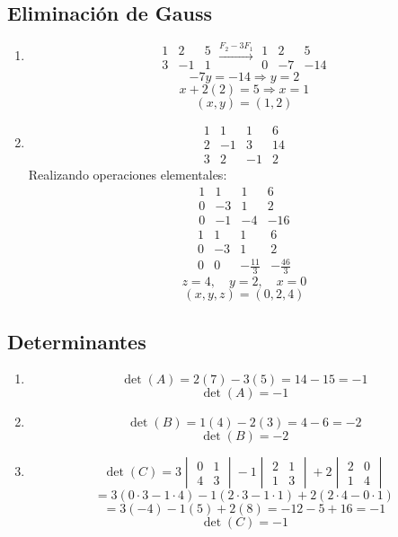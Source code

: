\documentclass[12pt,a4paper]{article}
\begin{document}
\subsection*{Eliminación de Gauss}
\begin{enumerate}
    \item
    \[
    \begin{array}{cc|c}
    1 & 2 & 5 \\
    3 & -1 & 1
    \end{array}
    \xrightarrow{F_2-3F_1}
    \begin{array}{cc|c}
    1 & 2 & 5 \\
    0 & -7 & -14
    \end{array}
    \]
    \[
    -7y = -14 \Rightarrow y = 2
    \]
    \[
    x + 2(2) = 5 \Rightarrow x = 1
    \]
    \[
    \boxed{(x,y)=(1,2)}
    \]

    \item
    \[
    \begin{array}{ccc|c}
    1 & 1 & 1 & 6 \\
    2 & -1 & 3 & 14 \\
    3 & 2 & -1 & 2
    \end{array}
    \]
    Realizando operaciones elementales:
    \[
    \begin{array}{ccc|c}
    1 & 1 & 1 & 6 \\
    0 & -3 & 1 & 2 \\
    0 & -1 & -4 & -16
    \end{array}
    \]
    \[
    \begin{array}{ccc|c}
    1 & 1 & 1 & 6 \\
    0 & -3 & 1 & 2 \\
    0 & 0 & -\frac{11}{3} & -\frac{46}{3}
    \end{array}
    \]
    \[
    z = 4, \quad y = 2, \quad x = 0
    \]
    \[
    \boxed{(x,y,z)=(0,2,4)}
    \]
\end{enumerate}

\subsection*{Determinantes}
\begin{enumerate}
    \item
    \[
    \det(A) = 2(7)-3(5)=14-15=-1
    \]
    \[
    \boxed{\det(A)=-1}
    \]

    \item
    \[
    \det(B) = 1(4)-2(3)=4-6=-2
    \]
    \[
    \boxed{\det(B)=-2}
    \]

    \item
    \[
    \det(C)=3\begin{vmatrix}0&1\\4&3\end{vmatrix}-1\begin{vmatrix}2&1\\1&3\end{vmatrix}+2\begin{vmatrix}2&0\\1&4\end{vmatrix}
    \]
    \[
    =3(0\cdot3-1\cdot4)-1(2\cdot3-1\cdot1)+2(2\cdot4-0\cdot1)
    \]
    \[
    =3(-4)-1(5)+2(8)=-12-5+16=-1
    \]
    \[
    \boxed{\det(C)=-1}
    \]
\end{enumerate}
\end{document}

